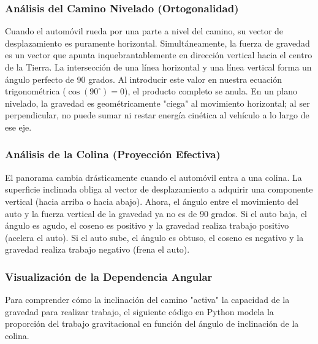 \documentclass[a4paper,12pt]{article}
\begin{document}
\subsubsection*{Análisis del Camino Nivelado (Ortogonalidad)}
Cuando el automóvil rueda por una parte a nivel del camino, su vector de desplazamiento es puramente horizontal. Simultáneamente, la fuerza de gravedad es un vector que apunta inquebrantablemente en dirección vertical hacia el centro de la Tierra. 
La intersección de una línea horizontal y una línea vertical forma un ángulo perfecto de 90 grados. Al introducir este valor en nuestra ecuación trigonométrica ($\cos(90^\circ) = 0$), el producto completo se anula. En un plano nivelado, la gravedad es geométricamente "ciega" al movimiento horizontal; al ser perpendicular, no puede sumar ni restar energía cinética al vehículo a lo largo de ese eje.

\subsubsection*{Análisis de la Colina (Proyección Efectiva)}
El panorama cambia drásticamente cuando el automóvil entra a una colina. La superficie inclinada obliga al vector de desplazamiento a adquirir una componente vertical (hacia arriba o hacia abajo). Ahora, el ángulo entre el movimiento del auto y la fuerza vertical de la gravedad ya no es de 90 grados. 
Si el auto baja, el ángulo es agudo, el coseno es positivo y la gravedad realiza trabajo positivo (acelera el auto). Si el auto sube, el ángulo es obtuso, el coseno es negativo y la gravedad realiza trabajo negativo (frena el auto).

\subsubsection*{Visualización de la Dependencia Angular}
Para comprender cómo la inclinación del camino "activa" la capacidad de la gravedad para realizar trabajo, el siguiente código en Python modela la proporción del trabajo gravitacional en función del ángulo de inclinación de la colina.
\end{document}
